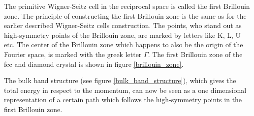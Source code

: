 		The primitive Wigner-Seitz cell in the reciprocal space is called the first Brillouin zone. 
		The principle of constructing the first Brillouin zone is the same as for the earlier described Wigner-Seitz cells construction. The points, who stand out as high-symmetry points of the Brillouin zone, are marked by letters like K, L, U etc. The center of the Brillouin zone which happens to also be the origin of the Fourier space, is marked with the greek letter $\Gamma$.  
		The first Brillouin zone of the fcc and diamond crystal is shown in figure  \ref{brillouin_zone}.		


		
		The bulk band structure (see figure \ref{bulk_band_structure}), which gives the total energy in respect to the momentum, can now be seen as a one dimensional representation of a certain path which follows the high-symmetry points in the first Brillouin zone. 
		
